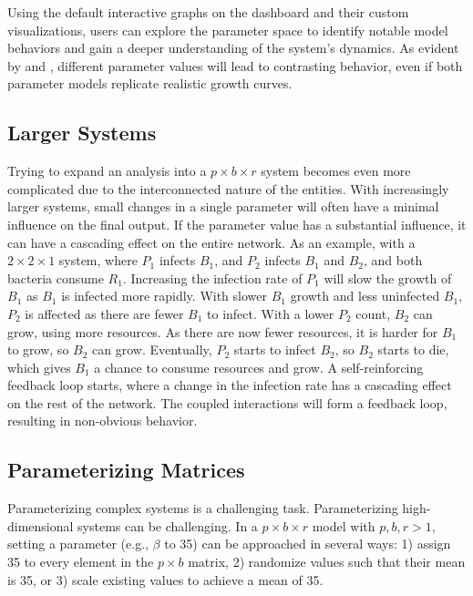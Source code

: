 Using the default interactive graphs on the dashboard and their custom visualizations, users can explore the parameter space to identify notable model behaviors and gain a deeper understanding of the system’s dynamics. 
As evident by  and , different parameter values will lead to contrasting behavior, even if both parameter models replicate realistic growth curves. 

\subsection{Larger Systems}
Trying to expand an analysis into a $p\times b\times r$ system becomes even more complicated due to the interconnected nature of the entities. 
With increasingly larger systems, small changes in a single parameter will often have a minimal influence on the final output. 
If the parameter value has a substantial influence, it can have a cascading effect on the entire network. 
As an example, with a $2\times 2\times 1$ system, where $P_1$ infects $B_1$, and $P_2$ infects $B_1$ and $B_2$, and both bacteria consume $R_1$.  
Increasing the infection rate of $P_1$ will slow the growth of $B_1$ as $B_1$ is infected more rapidly. 
With slower $B_1$ growth and less uninfected $B_1$, $P_2$ is affected as there are fewer $B_1$ to infect. With a lower $P_2$ count, $B_2$ can grow, using more resources. 
As there are now fewer resources, it is harder for $B_1$ to grow, so $B_2$ can grow. 
Eventually, $P_2$ starts to infect $B_2$, so $B_2$ starts to die, which gives $B_1$ a chance to consume resources and grow. 
A self-reinforcing feedback loop starts, where a change in the infection rate has a cascading effect on the rest of the network. 
The coupled interactions will form a feedback loop, resulting in non-obvious behavior. 

\subsection{Parameterizing Matrices}
Parameterizing complex systems is a challenging task. 
Parameterizing high-dimensional systems can be challenging. 
In a $p \times b \times r$ model with $p, b, r > 1$, setting a parameter (e.g., $\beta$ to 35) can be approached in several ways: 1) assign 35 to every element in the $p \times b$ matrix, 2) randomize values such that their mean is 35, or 3) scale existing values to achieve a mean of 35.

